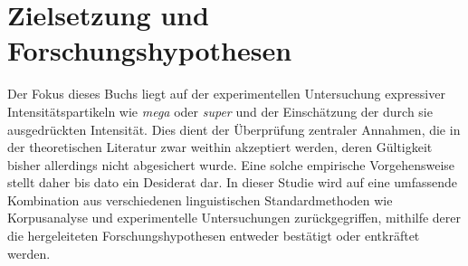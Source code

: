 





















\section{Zielsetzung und Forschungshypothesen}\label{abs:ziel}
Der Fokus dieses Buchs liegt auf der experimentellen Untersuchung expressiver Intensitätspartikeln wie \textit{mega} oder \textit{super} und der Einschätzung der durch sie ausgedrückten Intensität. Dies dient der Überprüfung zentraler Annahmen, die in der theoretischen Literatur zwar weithin akzeptiert werden, deren Gültigkeit bisher allerdings nicht abgesichert wurde. Eine solche empirische Vorgehensweise stellt daher bis dato ein Desiderat dar. In dieser Studie wird auf eine umfassende Kombination aus verschiedenen linguistischen Standardmethoden wie Korpusanalyse und experimentelle Untersuchungen zurückgegriffen, mithilfe derer die hergeleiteten Forschungshypothesen entweder bestätigt oder entkräftet werden.

